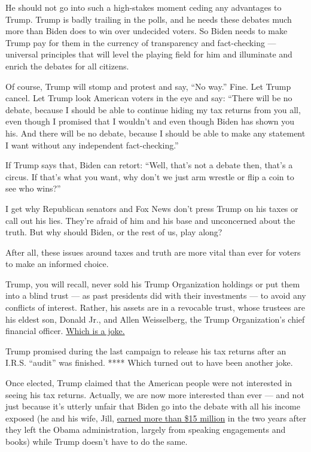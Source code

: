 He should not go into such a high-stakes moment ceding any advantages to
Trump. Trump is badly trailing in the polls, and he needs these debates
much more than Biden does to win over undecided voters. So Biden needs
to make Trump pay for them in the currency of transparency and
fact-checking --- universal principles that will level the playing field
for him and illuminate and enrich the debates for all citizens.

Of course, Trump will stomp and protest and say, ``No way.'' Fine. Let
Trump cancel. Let Trump look American voters in the eye and say: ``There
will be no debate, because I should be able to continue hiding my tax
returns from you all, even though I promised that I wouldn't and even
though Biden has shown you his. And there will be no debate, because I
should be able to make any statement I want without any independent
fact-checking.''

If Trump says that, Biden can retort: ``Well, that's not a debate then,
that's a circus. If that's what you want, why don't we just arm wrestle
or flip a coin to see who wins?''

I get why Republican senators and Fox News don't press Trump on his
taxes or call out his lies. They're afraid of him and his base and
unconcerned about the truth. But why should Biden, or the rest of us,
play along?

After all, these issues around taxes and truth are more vital than ever
for voters to make an informed choice.

Trump, you will recall, never sold his Trump Organization holdings or
put them into a blind trust --- as past presidents did with their
investments --- to avoid any conflicts of interest. Rather, his assets
are in a revocable trust, whose trustees are his eldest son, Donald Jr.,
and Allen Weisselberg, the Trump Organization's chief financial officer.
\href{https://www.npr.org/2017/04/03/522511211/change-to-president-trumps-trust-lets-him-tap-business-profits}{Which
is a joke.}

Trump promised during the last campaign to release his tax returns after
an I.R.S. ``audit'' was finished. **** Which turned out to have been
another joke.

Once elected, Trump claimed that the American people were not interested
in seeing his tax returns. Actually, we are now more interested than
ever --- and not just because it's utterly unfair that Biden go into the
debate with all his income exposed (he and his wife, Jill,
\href{https://www.cnbc.com/2019/07/09/joe-biden-releases-tax-returns-during-2020-democratic-primary.html}{earned
more than \$15 million} in the two years after they left the Obama
administration, largely from speaking engagements and books) while Trump
doesn't have to do the same.

